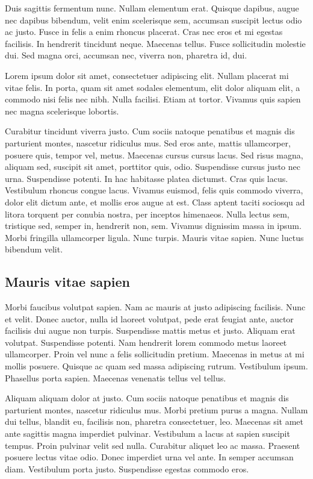 \documentclass[../hdr.tex]{subfiles}
\begin{document}
Duis sagittis fermentum nunc. Nullam elementum erat. Quisque dapibus, augue nec
dapibus bibendum, velit enim scelerisque sem, accumsan suscipit lectus odio ac
justo. Fusce in felis a enim rhoncus placerat. Cras nec eros et mi egestas
facilisis. In hendrerit tincidunt neque. Maecenas tellus. Fusce sollicitudin
molestie dui. Sed magna orci, accumsan nec, viverra non, pharetra id, dui.

Lorem ipsum dolor sit amet, consectetuer adipiscing elit. Nullam placerat mi
vitae felis. In porta, quam sit amet sodales elementum, elit dolor aliquam elit,
a commodo nisi felis nec nibh. Nulla facilisi. Etiam at tortor. Vivamus quis
sapien nec magna scelerisque lobortis.

Curabitur tincidunt viverra justo. Cum sociis natoque penatibus et magnis dis
parturient montes, nascetur ridiculus mus. Sed eros ante, mattis ullamcorper,
posuere quis, tempor vel, metus. Maecenas cursus cursus lacus. Sed risus magna,
aliquam sed, suscipit sit amet, porttitor quis, odio. Suspendisse cursus justo
nec urna. Suspendisse potenti. In hac habitasse platea dictumst. Cras quis
lacus. Vestibulum rhoncus congue lacus. Vivamus euismod, felis quis commodo
viverra, dolor elit dictum ante, et mollis eros augue at est. Class aptent
taciti sociosqu ad litora torquent per conubia nostra, per inceptos himenaeos.
Nulla lectus sem, tristique sed, semper in, hendrerit non, sem. Vivamus
dignissim massa in ipsum. Morbi fringilla ullamcorper ligula. Nunc turpis.
Mauris vitae sapien. Nunc luctus bibendum velit.

\subsection{Mauris vitae sapien}

Morbi faucibus volutpat sapien. Nam ac mauris at justo adipiscing facilisis.
Nunc et velit. Donec auctor, nulla id laoreet volutpat, pede erat feugiat ante,
auctor facilisis dui augue non turpis. Suspendisse mattis metus et justo.
Aliquam erat volutpat. Suspendisse potenti. Nam hendrerit lorem commodo metus
laoreet ullamcorper. Proin vel nunc a felis sollicitudin pretium. Maecenas in
metus at mi mollis posuere. Quisque ac quam sed massa adipiscing rutrum.
Vestibulum ipsum. Phasellus porta sapien. Maecenas venenatis tellus vel tellus.

Aliquam aliquam dolor at justo. Cum sociis natoque penatibus et magnis dis
parturient montes, nascetur ridiculus mus. Morbi pretium purus a magna. Nullam
dui tellus, blandit eu, facilisis non, pharetra consectetuer, leo. Maecenas sit
amet ante sagittis magna imperdiet pulvinar. Vestibulum a lacus at sapien
suscipit tempus. Proin pulvinar velit sed nulla. Curabitur aliquet leo ac massa.
Praesent posuere lectus vitae odio. Donec imperdiet urna vel ante. In semper
accumsan diam. Vestibulum porta justo. Suspendisse egestas commodo eros.
\end{document}
